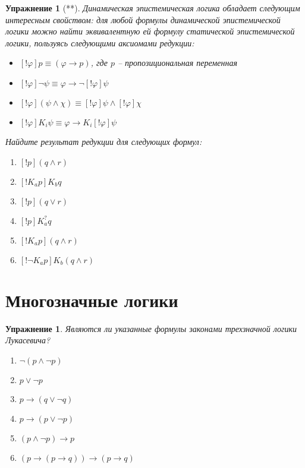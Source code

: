 \documentclass[11pt]{article}
\newtheorem{exercise}[theorem]{Упражнение}
\begin{document}
\begin{exercise}[**] Динамическая эпистемическая логика обладает следующим интересным свойством: для любой формулы динамической эпистемической логики можно найти эквивалентную ей формулу статической эпистемической логики, пользуясь следующими аксиомами редукции:
\begin{itemize}
\item $[!\varphi]p \equiv ( \varphi \to p)$, где $p$ – пропозициональная переменная 
\item $[! \varphi] \neg \psi \equiv  \varphi \to \neg [!\varphi]\psi$ 
\item $[!\varphi]( \psi \wedge \chi)\equiv [!\varphi]\psi \wedge [!\varphi]\chi $ 
\item $[! \varphi] K_i \psi \equiv \varphi \to K_i[!\varphi]\psi $ 
\end{itemize} 

Найдите результат редукции для следующих формул:
\begin{multicols}{3}
\begin{enumerate}
\item $ [!p] (q \wedge  r) $
\item $ [!K_a p] K_b q$
\item $ [!p] (q \vee r) $
\item $ [!p] K^{?}_a q $
\item $[!K_a p] (q \wedge r)$		
\item $[! \neg K_a p] K_b (q \wedge r)$	
\end{enumerate}
\end{multicols}

\end{exercise}





\section{Многозначные логики}

\begin{exercise} Являются ли указанные формулы законами трехзначной логики Лукасевича?  
\begin{multicols}{2}
\begin{enumerate}
	\item $\neg (p \wedge \neg p)$
	\item $p \vee \neg p$
	\item $p \to (q \vee \neg q)$
	\item $p \to (p \vee \neg p)$
	\item $(p \wedge \neg p) \to p$
	\item $(p \to (p \to q)) \to (p \to q)$
\end{enumerate}
\end{multicols}
\end{exercise}
\end{document}

